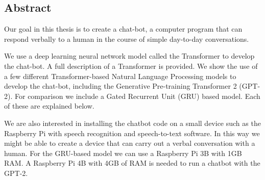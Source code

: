 
\begin{center}
	
\section*{Abstract}
\end{center}



Our goal in this thesis is to create a chat-bot, a computer program that can respond verbally to a human in the course of simple day-to-day conversations.

We use a deep learning neural network model called the Transformer to develop the chat-bot. A full description of a Transformer is provided. We show  the use of a few different Transformer-based Natural Language Processing models to develop the chat-bot, including the Generative Pre-training Transformer 2 (GPT-2). For comparison we include a Gated Recurrent Unit (GRU) based model. Each of these are explained below.

We are also interested in installing the chatbot code on a small device  such as the Raspberry Pi with speech recognition and speech-to-text software. In this way we might be able to create a device that can carry out a verbal conversation with a human. For the GRU-based model we can use a Raspberry Pi 3B with 1GB RAM. A Raspberry Pi 4B with 4GB of RAM is needed to run a chatbot with the GPT-2. 


